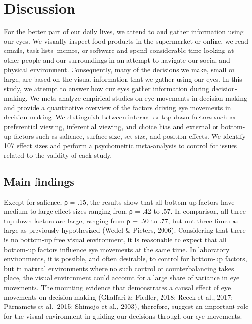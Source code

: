\documentclass{article}
\begin{document}

\section{Discussion}

For the better part of our daily lives, we attend to and gather information using our eyes. We visually inspect food products in the supermarket or online, we read emails, task lists, memos, or software and spend considerable time looking at other people and our surroundings in an attempt to navigate our social and physical environment. Consequently, many of the decisions we make, small or large, are based on the visual information that we gather using our eyes. In this study, we attempt to answer how our eyes gather information during decision-making. We meta-analyze empirical studies on eye movements in decision-making and provide a quantitative overview of the factors driving eye movements in decision-making. We distinguish between internal or top-down factors such as preferential viewing, inferential viewing, and choice bias and external or bottom-up factors such as salience, surface size, set size, and position effects. We identify 107 effect sizes and perform a psychometric meta-analysis to control for issues related to the validity of each study. 

\subsection{Main findings}

Except for salience, ρ = .15, the results show that all bottom-up factors have medium to large effect sizes ranging from ρ = .42 to .57. In comparison, all three top-down factors are large, ranging from ρ = .50 to .77, but not three times as large as previously hypothesized (Wedel \& Pieters, 2006). Considering that there is no bottom-up free visual environment, it is reasonable to expect that all bottom-up factors influence eye movements at the same time. In laboratory environments, it is possible, and often desirable, to control for bottom-up factors, but in natural environments where no such control or counterbalancing takes place, the visual environment could account for a large share of variance in eye movements. The mounting evidence that demonstrates a causal effect of eye movements on decision-making (Ghaffari \& Fiedler, 2018; Reeck et al., 2017; Pärnamets et al., 2015; Shimojo et al., 2003), therefore, suggest an important role for the visual environment in guiding our decisions through our eye movements. 
\end{document}
